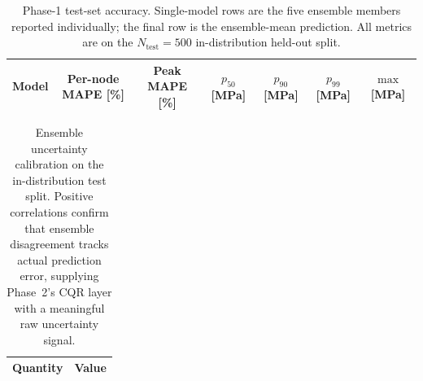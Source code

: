 \begin{table}[t]
  \centering
  \caption{Phase-1 test-set accuracy. Single-model rows are the five
    ensemble members reported individually; the final row is the
    ensemble-mean prediction. All metrics are on the
    $N_{\mathrm{test}} = 500$ in-distribution held-out split.}
  \label{tab:phase1-accuracy}
  \begin{tabular}{lcccccc}
    \toprule
    Model & Per-node MAPE [\%] & Peak MAPE [\%] &
    $p_{50}$ [MPa] & $p_{90}$ [MPa] & $p_{99}$ [MPa] & $\max$ [MPa] \\
    \midrule
    
    \bottomrule
  \end{tabular}
\end{table}

\begin{table}[t]
  \centering
  \caption{Ensemble uncertainty calibration on the in-distribution test
    split. Positive correlations confirm that ensemble disagreement
    tracks actual prediction error, supplying Phase~2's CQR layer with a
    meaningful raw uncertainty signal.}
  \label{tab:phase1-calibration}
  \begin{tabular}{lc}
    \toprule
    Quantity & Value \\
    \midrule
    
    \bottomrule
  \end{tabular}
\end{table}
